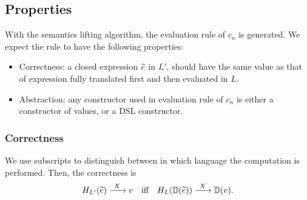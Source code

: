 
\subsection{Properties}

With the semantics lifting algorithm, the evaluation rule of $c_n$ is generated.
We expect the rule to have the following properties:
\begin{itemize}
  \item Correctness: a closed expression $\widetilde{e}$ in $L'$, should have the same value as 
         that of expression fully translated first and then evaluated in $L$.
  \item Abstraction: any constructor used in evaluation rule of $c_n$ is either a constructor of values,
         or a DSL constructor.
\end{itemize}

\subsubsection{Correctness}
We use subscripts to distinguish between in which language the computation is performed.
Then, the correctness is
\[ H_{L'}(\widetilde{e}) \xrightarrow{~X~} v \quad\text{iff}\quad H_{L}(\mathbb{D}(\widetilde{e})) \xrightarrow{~X~} \mathbb{D}(v). \]


